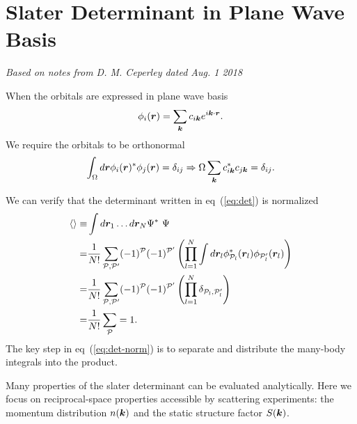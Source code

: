 \section{Slater Determinant in Plane Wave Basis}
\label{sec:wf-pw-sdet}
\textit{Based on notes from D. M. Ceperley dated Aug. 1 2018}

When the orbitals are expressed in plane wave basis
\begin{align}
\phi_i(\boldsymbol{r}) = \sum\limits_{\boldsymbol{k}} c_{i\boldsymbol{k}} e^{i\boldsymbol{k}\cdot\boldsymbol{r}}. \label{eq:pw-orb}
\end{align}
We require the orbitals to be orthonormal
\begin{align}
\int_\Omega d\boldsymbol{r} \phi_i(\boldsymbol{r})^*\phi_j(\boldsymbol{r}) = \delta_{ij} \Rightarrow 
\Omega \sum\limits_{\boldsymbol{k}} c_{i\boldsymbol{k}}^*c_{j\boldsymbol{k}} = \delta_{ij}. \label{eq:on_orbs}
\end{align}

We can verify that the determinant written in eq~(\ref{eq:det}) is normalized
\begin{align}
\braket{} \equiv& \int d\boldsymbol{r}_1\dots d\boldsymbol{r}_N \Psi^*~ \Psi \nonumber \\
=& \frac{1}{N!} \sum\limits_{\mathcal{P},\mathcal{P'}} (-1)^{\mathcal{P}} (-1)^{\mathcal{P'}}
\left(
\prod\limits_{l=1}^{N} \int d\boldsymbol{r}_l \phi^*_{\mathcal{P}_l}(\boldsymbol{r}_l)\phi_{\mathcal{P}_l'}(\boldsymbol{r}_l)
\right)\nonumber \\
=& \frac{1}{N!} \sum\limits_{\mathcal{P},\mathcal{P'}} (-1)^{\mathcal{P}} (-1)^{\mathcal{P'}}
\left(
\prod\limits_{l=1}^{N} \delta_{\mathcal{P}_l,\mathcal{P}_l'}
\right) \nonumber \\
=& \frac{1}{N!} \sum\limits_{\mathcal{P}} = 1. \label{eq:det-norm}
\end{align}
The key step in eq~(\ref{eq:det-norm}) is to separate and distribute the many-body integrals into the product.


Many properties of the slater determinant can be evaluated analytically. Here we focus on reciprocal-space properties accessible by scattering experiments: the momentum distribution $n(\boldsymbol{k})$ and the static structure factor $S(\boldsymbol{k})$. %

